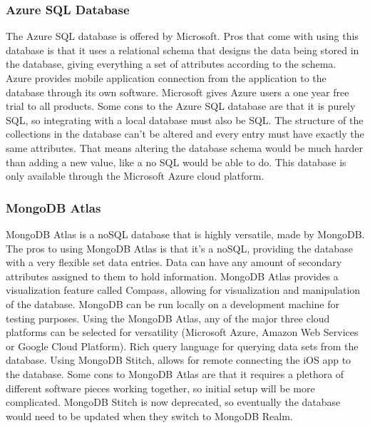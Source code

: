 \documentclass[letterpaper,10pt,draftclsnofoot,onecolumn,compsoc]{IEEEtran}
\begin{document}
\subsubsection{Azure SQL Database}
\begin{singlespace}
\noindent
The Azure SQL database is offered by Microsoft. Pros that come with using this database is that it uses a relational schema that designs the data being stored in the database, giving everything a set of attributes according to the schema. Azure provides mobile application connection from the application to the database through its own software. Microsoft gives Azure users a one year free trial to all products. Some cons to the Azure SQL database are that it is purely SQL, so integrating with a local database must also be SQL. The structure of the collections in the database can't be altered and every entry must have exactly the same attributes. That means altering the database schema would be much harder than adding a new value, like a no SQL would be able to do. This database is only available through the Microsoft Azure cloud platform.
\end{singlespace}

\subsubsection{MongoDB Atlas}
\begin{singlespace}
\noindent
MongoDB Atlas is a noSQL database that is highly versatile, made by MongoDB. The pros to using MongoDB Atlas is that it's a noSQL, providing the database with a very flexible set data entries. Data can have any amount of secondary attributes assigned to them to hold information. MongoDB Atlas provides a visualization feature called Compass, allowing for visualization and manipulation of the database. MongoDB can be run locally on a development machine for testing purposes. Using the MongoDB Atlas, any of the major three cloud platforms can be selected for versatility (Microsoft Azure, Amazon Web Services or Google Cloud Platform). Rich query language for querying data sets from the database. Using MongoDB Stitch, allows for remote connecting the iOS app to the database. Some cons to MongoDB Atlas are that it requires a plethora of different software pieces working together, so initial setup will be more complicated. MongoDB Stitch is now deprecated, so eventually the database would need to be updated when they switch to MongoDB Realm.
\end{singlespace}
\end{document}
